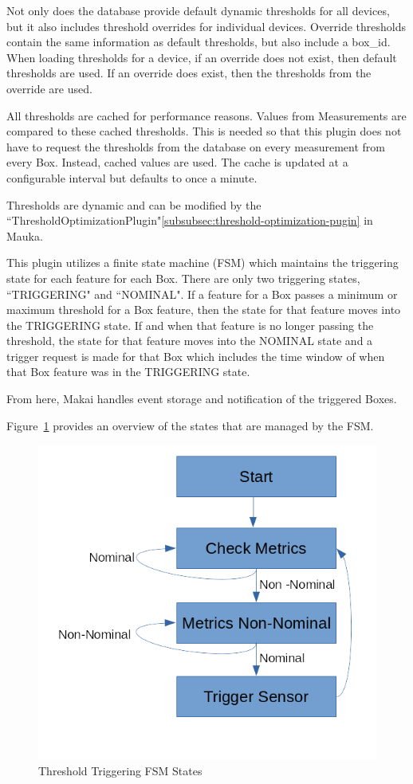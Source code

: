 Not only does the database provide default dynamic thresholds for all devices, but it also includes threshold overrides for individual devices. Override thresholds contain the same information as default thresholds, but also include a box\_id. When loading thresholds for a device, if an override does not exist, then default thresholds are used. If an override does exist, then the thresholds from the override are used.

All thresholds are cached for performance reasons. Values from Measurements are compared to these cached thresholds. This is needed so that this plugin does not have to request the thresholds from the database on every measurement from every Box. Instead, cached values are used. The cache is updated at a configurable interval but defaults to once a minute.

Thresholds are dynamic and can be modified by the ``ThresholdOptimizationPlugin"\ref{subsubsec:threshold-optimization-pugin} in Mauka.

This plugin utilizes a finite state machine (FSM) which maintains the triggering state for each feature for each Box. There are only two triggering states, ``TRIGGERING" and ``NOMINAL". If a feature for a Box passes a minimum or maximum threshold for a Box feature, then the state for that feature moves into the TRIGGERING state. If and when that feature is no longer passing the threshold, the state for that feature moves into the NOMINAL state and a trigger request is made for that Box which includes the time window of when that Box feature was in the TRIGGERING state.

From here, Makai handles event storage and notification of the triggered Boxes.

Figure~\ref{fig:threshold_triggering} provides an overview of the states that are managed by the FSM\@.

\begin{figure}
	\centering
	\includegraphics[width=.75\linewidth]{figures/trigger_fsn.png}
	\caption{Threshold Triggering FSM States}
	\label{fig:threshold_triggering}
\end{figure}

